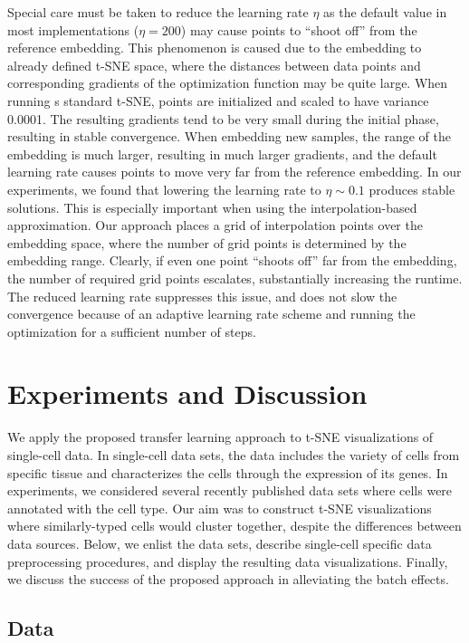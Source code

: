 \documentclass[runningheads]{llncs}
\begin{document}
Special care must be taken to reduce the learning rate $\eta$ as the default value in most implementations ($\eta = 200$) may cause points to ``shoot off'' from the reference embedding. This phenomenon is caused due to the embedding to already defined t-SNE space, where the distances between data points and corresponding gradients of the optimization function may be quite large. When running s standard t-SNE, points are initialized and scaled to have variance 0.0001. The resulting gradients tend to be very small during the initial phase, resulting in stable convergence. When embedding new samples, the range of the embedding is much larger, resulting in much larger gradients, and the default learning rate causes points to move very far from the reference embedding. In our experiments, we found that lowering the learning rate to $\eta \sim 0.1$ produces stable solutions. This is especially important when using the interpolation-based approximation. Our approach places a grid of interpolation points over the embedding space, where the number of grid points is determined by the embedding range. Clearly, if even one point ``shoots off'' far from the embedding, the number of required grid points escalates, substantially increasing the runtime. The reduced learning rate suppresses this issue, and does not slow the convergence because of an adaptive learning rate scheme and running the optimization for a sufficient number of steps. 

\section{Experiments and Discussion}

We apply the proposed transfer learning approach to t-SNE visualizations of single-cell data. In single-cell data sets, the data includes the variety of cells from specific tissue and characterizes the cells through the expression of its genes. In experiments, we considered several recently published data sets where cells were annotated with the cell type. Our aim was to construct t-SNE visualizations where similarly-typed cells would cluster together, despite the differences between data sources. Below, we enlist the data sets, describe single-cell specific data preprocessing procedures, and display the resulting data visualizations. Finally, we discuss the success of the proposed approach in alleviating the batch effects.


\subsection{Data}
\end{document}
